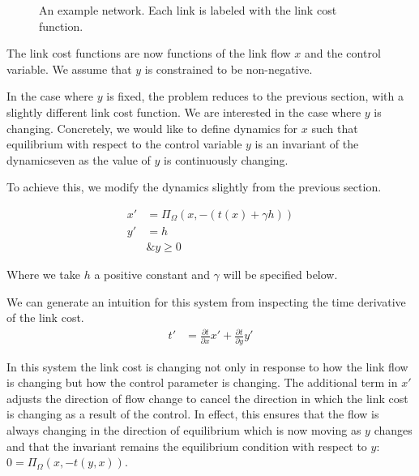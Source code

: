 \begin{figure}[!ht]
    \centering
    \caption{An example network. Each link is labeled with the link cost function.}
    \label{fig:example-netowkr}
\end{figure}

The link cost functions are now functions of the link flow $x$ and the control variable.
We assume that $y$ is constrained to be non-negative.

In the case where $y$ is fixed, the problem reduces to the previous section, with a slightly different link cost function.
We are interested in the case where $y$ is changing.
Concretely, we would like to define dynamics for $x$ such that equilibrium with respect to the control variable $y$ is an invariant of the dynamics\textemdash even as the value of $y$ is continuously changing.

To achieve this, we modify the dynamics slightly from the previous section.

\begin{subequations}
\begin{align}
    x' &= \Pi_{\Omega}\left(x, -\left(t(x) + \gamma h \right)\right)\\
    y' &= h \\
       &\& y \geq 0
\end{align}\label{eqn:appendix:single-player-dynamics}
\end{subequations}

Where we take $h$ a positive constant and $\gamma$ will be specified below.

We can generate an intuition for this system from inspecting the time derivative of the link cost.
\begin{align}
    t' &= \frac{\partial t}{\partial x} x' + \frac{\partial t}{\partial y}y'
\end{align}

In this system the link cost is changing not only in response to how the link flow is changing but how the control parameter is changing.
The additional term in $x'$ adjusts the direction of flow change to cancel the direction in which the link cost is changing as a result of the control.
In effect, this ensures that the flow is always changing in the direction of equilibrium which is now moving as $y$ changes and that the invariant remains the equilibrium condition with respect to $y$: $0= \Pi_{\Omega}(x, -t(y, x))$.


